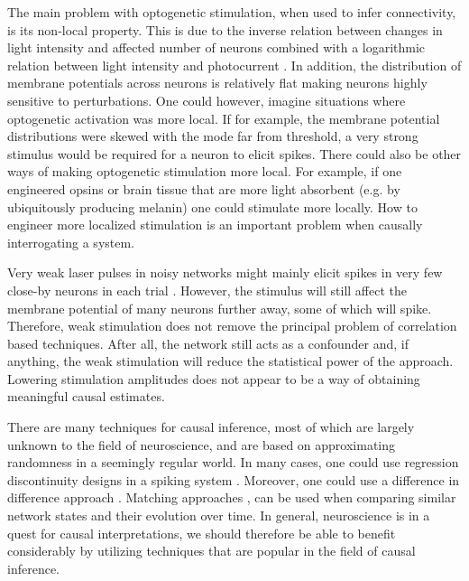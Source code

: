 \documentclass[11pt]{article}
\begin{document}
The main problem with optogenetic stimulation, when used to infer connectivity, is its non-local property. 
This is due to the inverse relation between changes in light intensity and affected number of neurons combined with a logarithmic relation between light intensity and photocurrent \cite{wang2007high}. 
In addition, the distribution of membrane potentials across neurons is relatively flat \citep{destexhe1999impact,rudolph2006use,pare1998impact} making neurons highly sensitive to perturbations. 
One could however, imagine situations where optogenetic activation was more local. 
If for example, the membrane potential distributions were skewed with the mode far from threshold, a very strong stimulus would be required for a neuron to elicit spikes. 
There could also be other ways of making optogenetic stimulation more local. 
For example, if one engineered opsins or brain tissue that are more light absorbent (e.g. by ubiquitously producing melanin) one could stimulate more locally. 
How to engineer more localized stimulation is an important problem when causally interrogating a system.

Very weak laser pulses in noisy networks might mainly elicit spikes in very few close-by neurons in each trial \citep{English2017}. 
However, the stimulus will still affect the membrane potential of many neurons further away, some of which will spike. 
Therefore, weak stimulation does not remove the principal problem of correlation based techniques. 
After all, the network still acts as a confounder and, if anything, the weak stimulation will reduce the statistical power of the approach. 
Lowering stimulation amplitudes does not appear to be a way of obtaining meaningful causal estimates.

There are many techniques for causal inference, most of which are largely unknown to the field of neuroscience, and are based on approximating randomness in a seemingly regular world. 
In many cases, one could use regression discontinuity designs in a spiking system \citep{lansdell2018spiking, imbens2008regression}. 
Moreover, one could use a difference in difference approach \citep{abadie2005semiparametric}. 
Matching approaches \citep{stuart2010matching, king2016propensity}, can be used when comparing similar network states and their evolution over time. 
In general, neuroscience is in a quest for causal interpretations, we should therefore be able to benefit considerably by utilizing techniques that are popular in the field of causal inference.
\end{document}
